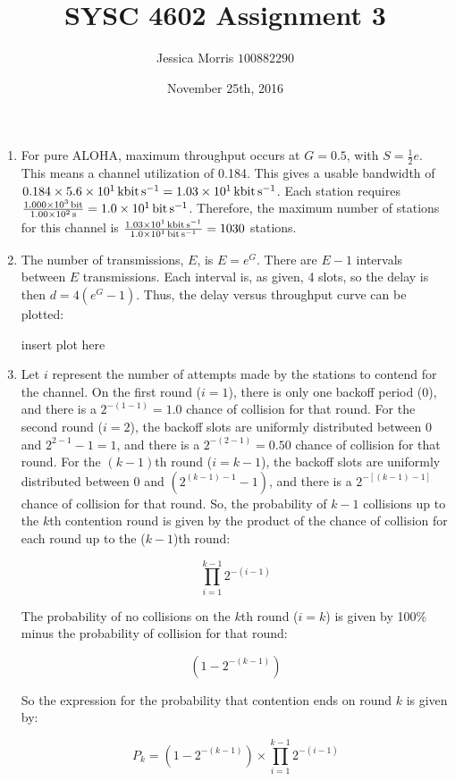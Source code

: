 \documentclass{article}
\title{SYSC 4602 Assignment 3}
\date{November 25th, 2016}
\author{Jessica Morris \(100882290\)}
\begin{document}
\maketitle

\begin{enumerate}

\item For pure ALOHA, maximum throughput occurs at $ G = 0.5 $, with $ S = \frac{1}{2}e $. This means a channel utilization of 0.184. This gives a usable bandwidth of $ 0.184 \times \SI{56}{\kilo\bit\per\second} = \SI{10.3}{\kilo\bit\per\second} $.
Each station requires $ \frac{\SI{1000}{\bit}}{\SI{100}{\second}} = \SI{10}{\bit\per\second} $. Therefore, the maximum number of stations for this channel is $ \frac{\SI{10.3}{\kilo\bit\per\second}}{\SI{10}{\bit\per\second}} = 1030 $ stations.

\item The number of transmissions, $ E $, is $ E = e^G $. There are $ E - 1 $ intervals between $ E $ transmissions. Each interval is, as given, 4 slots, so the delay is then $ d = 4(e^G - 1) $. Thus, the delay versus throughput curve can be plotted:

insert plot here

\item Let $ i $ represent the number of attempts made by the stations to contend for the channel. On the first round ($ i = 1 $), there is only one backoff period (0), and there is a $ 2^{-(1-1)} = 1.0 $ chance of collision for that round. For the second round ($ i = 2 $), the backoff slots are uniformly distributed between 0 and $ 2^{2-1} - 1 = 1 $, and there is a $ 2^{-(2-1)} = 0.50 $ chance of collision for that round. For the $ (k - 1) $th round ($ i = k-1 $), the backoff slots are uniformly distributed between 0 and $ (2^{(k-1)-1} - 1) $, and there is a $ 2^{-[(k-1)-1]} $ chance of collision for that round. So, the probability of $ k-1 $ collisions up to the $ k $th contention round is given by the product of the chance of collision for each round up to the ($ k -1 $)th round:

$$ \prod_{i=1}^{k-1}2^{-(i-1)} $$

The probability of no collisions on the $ k $th round ($ i = k $) is given by 100\% minus the probability of collision for that round:

$$ (1-2^{-(k-1)}) $$

So the expression for the probability that contention ends on round $ k $ is given by:

$$ P_k = (1-2^{-(k-1)}) \times \prod_{i=1}^{k-1}2^{-(i-1)} $$


\end{enumerate}
\end{document}
